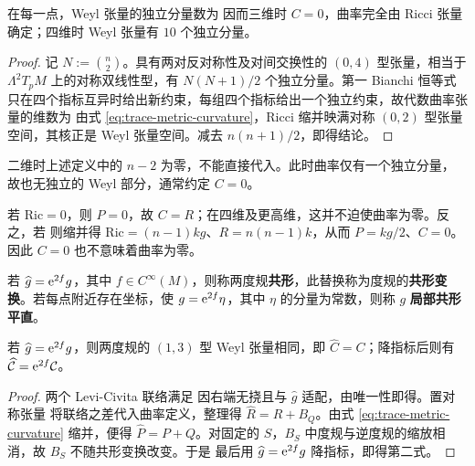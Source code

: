\begin{theorem}
    在每一点，Weyl 张量的独立分量数为
    因而三维时 $C=0$，曲率完全由 Ricci 张量确定；四维时 Weyl 张量有 $10$ 个独立分量。
\end{theorem}
\begin{proof}
    记 $N:=\binom n2$。具有两对反对称性及对间交换性的 $(0,4)$ 型张量，相当于 $\Lambda^2T_pM$ 上的对称双线性型，有 $N(N+1)/2$ 个独立分量。第一 Bianchi 恒等式只在四个指标互异时给出新约束，每组四个指标给出一个独立约束，故代数曲率张量的维数为
    由式 \eqref{eq:trace-metric-curvature}，Ricci 缩并映满对称 $(0,2)$ 型张量空间，其核正是 Weyl 张量空间。减去 $n(n+1)/2$，即得结论。
\end{proof}

\begin{remark}
    二维时上述定义中的 $n-2$ 为零，不能直接代入。此时曲率仅有一个独立分量，
    故也无独立的 Weyl 部分，通常约定 $C=0$。
\end{remark}

\begin{example}
    若 $\mathrm{Ric}=0$，则 $P=0$，故 $C=R$；在四维及更高维，这并不迫使曲率为零。反之，若
    则缩并得 $\mathrm{Ric}=(n-1)kg$、$R=n(n-1)k$，从而 $P=kg/2$、$C=0$。因此 $C=0$ 也不意味着曲率为零。
\end{example}

\begin{definition}
    若 $\widehat g=\mathrm{e}^{2f}g$，其中 $f\in C^\infty(M)$，则称两度规\textbf{共形}，此替换称为度规的\textbf{共形变换}。若每点附近存在坐标，使 $g=\mathrm{e}^{2f}\eta$，其中 $\eta$ 的分量为常数，则称 $g$ \textbf{局部共形平直}。
\end{definition}

\begin{theorem}
    若 $\widehat g=\mathrm{e}^{2f}g$，则两度规的 $(1,3)$ 型 Weyl 张量相同，即 $\widehat C=C$；降指标后则有 $\widehat{\mathcal C}=\mathrm{e}^{2f}\mathcal C$。
\end{theorem}
\begin{proof}
    两个 Levi-Civita 联络满足
    因右端无挠且与 $\widehat g$ 适配，由唯一性即得。置对称张量
    将联络之差代入曲率定义，整理得 $\widehat R=R+B_Q$。由式 \eqref{eq:trace-metric-curvature} 缩并，便得 $\widehat P=P+Q$。对固定的 $S$，$B_S$ 中度规与逆度规的缩放相消，故 $B_S$ 不随共形变换改变。于是
    最后用 $\widehat g=\mathrm{e}^{2f}g$ 降指标，即得第二式。
\end{proof}

